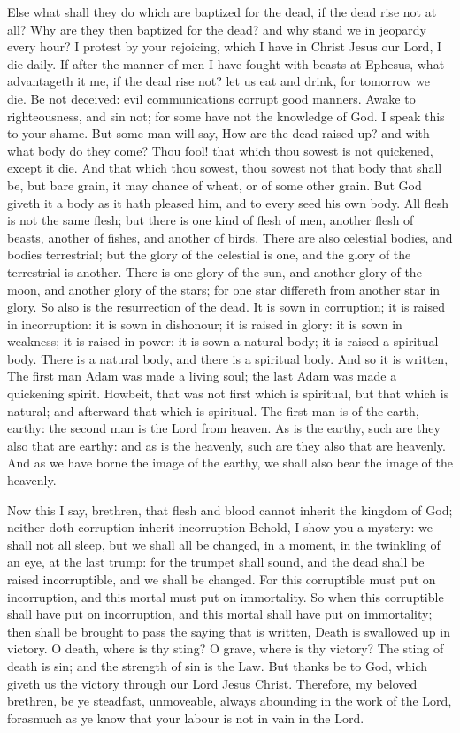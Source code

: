 Else what shall they do which are baptized for the dead, if the dead rise not at all? Why are they then baptized for the dead? and why stand we in jeopardy every hour? I protest by your rejoicing, which I have in Christ Jesus our Lord, I die daily. If after the manner of men I have fought with beasts at Ephesus, what advantageth it me, if the dead rise not? let us eat and drink, for tomorrow we die. Be not deceived: evil communications corrupt good manners. Awake to righteousness, and sin not; for some have not the knowledge of God. I speak this to your shame. But some man will say, How are the dead raised up? and with what body do they come? Thou fool! that which thou sowest is not quickened, except it die. And that which thou sowest, thou sowest not that body that shall be, but bare grain, it may chance of wheat, or of some other grain. But God giveth it a body as it hath pleased him, and to every seed his own body. All flesh is not the same flesh; but there is one kind of flesh of men, another flesh of beasts, another of fishes, and another of birds. There are also celestial bodies, and bodies terrestrial; but the glory of the celestial is one, and the glory of the terrestrial is another. There is one glory of the sun, and another glory of the moon, and another glory of the stars; for one star differeth from another star in glory. So also is the resurrection of the dead. It is sown in corruption; it is raised in incorruption: it is sown in dishonour; it is raised in glory: it is sown in weakness; it is raised in power: it is sown a natural body; it is raised a spiritual body. There is a natural body, and there is a spiritual body. And so it is written, The first man Adam was made a living soul; the last Adam was made a quickening spirit. Howbeit, that was not first which is spiritual, but that which is natural; and afterward that which is spiritual. The first man is of the earth, earthy: the second man is the Lord from heaven. As is the earthy, such are they also that are earthy: and as is the heavenly, such are they also that are heavenly. And as we have borne the image of the earthy, we shall also bear the image of the heavenly.\par
Now this I say, brethren, that flesh and blood cannot inherit the kingdom of God; neither doth corruption inherit incorruption Behold, I show you a mystery: we shall not all sleep, but we shall all be changed, in a moment, in the twinkling of an eye, at the last trump: for the trumpet shall sound, and the dead shall be raised incorruptible, and we shall be changed. For this corruptible must put on incorruption, and this mortal must put on immortality. So when this corruptible shall have put on incorruption, and this mortal shall have put on immortality; then shall be brought to pass the saying that is written, Death is swallowed up in victory. O death, where is thy sting? O grave, where is thy victory? The sting of death is sin; and the strength of sin is the Law. But thanks be to God, which giveth us the victory through our Lord Jesus Christ. Therefore, my beloved brethren, be ye steadfast, unmoveable, always abounding in the work of the Lord, forasmuch as ye know that your labour is not in vain in the Lord.
 
